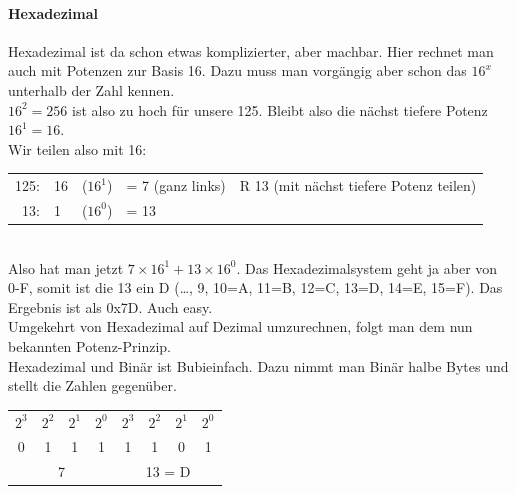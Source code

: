 \paragraph{Hexadezimal}Hexadezimal ist da schon etwas komplizierter, aber machbar. Hier rechnet man auch mit Potenzen zur Basis 16. Dazu muss man vorgängig aber schon das $16^x$ unterhalb der Zahl kennen.\\
$16^2=256$ ist also zu hoch für unsere 125. Bleibt also die nächst tiefere Potenz  $16^1=16$.\\
Wir teilen also mit 16:\\
\begin{tabular}{rllll}
    125:&16&($16^1$)&= 7 (ganz links)&R  13 (mit nächst tiefere Potenz teilen)\\
    13:&1&($16^0$) &= 13&\\[1em]
\end{tabular}\\
Also hat man jetzt $7\times16^1+13\times16^0$. Das Hexadezimalsystem geht ja aber von 0-F, somit ist die 13 ein D (\dots, 9, 10=A, 11=B, 12=C, 13=D, 14=E, 15=F). Das Ergebnis ist als 0x7D. Auch easy.\\
Umgekehrt von Hexadezimal auf Dezimal umzurechnen, folgt man dem nun bekannten Potenz-Prinzip.\\
Hexadezimal und Binär ist Bubieinfach. Dazu nimmt man Binär halbe Bytes und stellt die Zahlen gegenüber.\\
\begin{tabular}{cccc|cccc}
    $2^3$&$2^2$&$2^1$&$2^0$&$2^3$&$2^2$&$2^1$&$2^0$\\
    0&1&1&1&1&1&0&1\\
    \hline
    \multicolumn{4}{c|}{7}&\multicolumn{4}{c}{13 = D}\\
\end{tabular}
